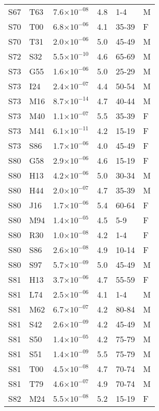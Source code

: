 \begin{longtable}{lllrll}
   S67 & T63 & 7.6$\times10^{-08}$ & 4.8 & 1-4 & M \\ 
   S70 & T00 & 6.8$\times10^{-06}$ & 4.1 & 35-39 & F \\ 
   S70 & T31 & 2.0$\times10^{-06}$ & 5.0 & 45-49 & M \\ 
   S72 & S32 & 5.5$\times10^{-10}$ & 4.6 & 65-69 & M \\ 
   S73 & G55 & 1.6$\times10^{-06}$ & 5.0 & 25-29 & M \\ 
   S73 & I24 & 2.4$\times10^{-07}$ & 4.4 & 50-54 & M \\ 
   S73 & M16 & 8.7$\times10^{-14}$ & 4.7 & 40-44 & M \\ 
   S73 & M40 & 1.1$\times10^{-07}$ & 5.5 & 35-39 & F \\ 
   S73 & M41 & 6.1$\times10^{-11}$ & 4.2 & 15-19 & F \\ 
   S73 & S86 & 1.7$\times10^{-06}$ & 4.0 & 45-49 & F \\ 
   S80 & G58 & 2.9$\times10^{-06}$ & 4.6 & 15-19 & F \\ 
   S80 & H13 & 4.2$\times10^{-06}$ & 5.0 & 30-34 & M \\ 
   S80 & H44 & 2.0$\times10^{-07}$ & 4.7 & 35-39 & M \\ 
   S80 & J16 & 1.7$\times10^{-06}$ & 5.4 & 60-64 & F \\ 
   S80 & M94 & 1.4$\times10^{-05}$ & 4.5 & 5-9 & F \\ 
   S80 & R30 & 1.0$\times10^{-08}$ & 4.2 & 1-4 & F \\ 
   S80 & S86 & 2.6$\times10^{-08}$ & 4.9 & 10-14 & F \\ 
   S80 & S97 & 5.7$\times10^{-09}$ & 5.0 & 45-49 & M \\ 
   S81 & H13 & 3.7$\times10^{-06}$ & 4.7 & 55-59 & F \\ 
   S81 & L74 & 2.5$\times10^{-06}$ & 4.1 & 1-4 & M \\ 
   S81 & M62 & 6.7$\times10^{-07}$ & 4.2 & 80-84 & M \\ 
   S81 & S42 & 2.6$\times10^{-09}$ & 4.2 & 45-49 & M \\ 
   S81 & S50 & 1.4$\times10^{-05}$ & 4.2 & 75-79 & M \\ 
   S81 & S51 & 1.4$\times10^{-09}$ & 5.5 & 75-79 & M \\ 
   S81 & T00 & 4.5$\times10^{-08}$ & 4.7 & 70-74 & M \\ 
   S81 & T79 & 4.6$\times10^{-07}$ & 4.9 & 70-74 & M \\ 
   S82 & M24 & 5.5$\times10^{-08}$ & 5.2 & 15-19 & F \\ 

\end{longtable}

